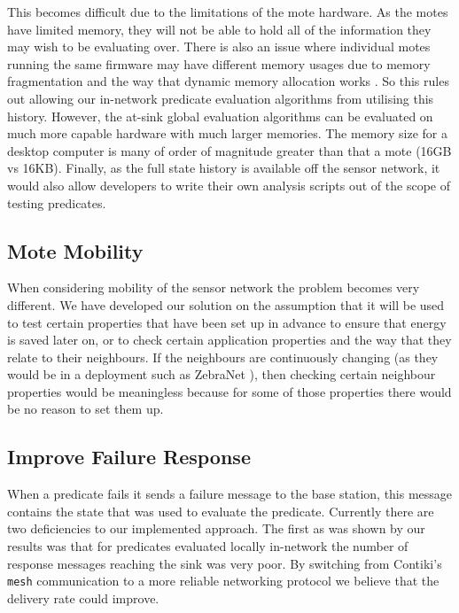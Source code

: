 This becomes difficult due to the limitations of the mote hardware. As the motes have limited memory, they will not be able to hold all of the information they may wish to be evaluating over. There is also an issue where individual motes running the same firmware may have different memory usages due to memory fragmentation and the way that dynamic memory allocation works \cite{Dai:2004:EEL:1031495.1031516}. So this rules out allowing our in-network predicate evaluation algorithms from utilising this history. However, the at-sink global evaluation algorithms can be evaluated on much more capable hardware with much larger memories. The memory size for a desktop computer is many of order of magnitude greater than that a mote (16GB vs 16KB). Finally, as the full state history is available off the sensor network, it would also allow developers to write their own analysis scripts out of the scope of testing predicates.


\subsection{Mote Mobility}

When considering mobility of the sensor network the problem becomes very different. We have developed our solution on the assumption that it will be used to test certain properties that have been set up in advance to ensure that energy is saved later on, or to check certain application properties and the way that they relate to their neighbours. If the neighbours are continuously changing (as they would be in a deployment such as ZebraNet \cite{Juang:2002:ECW:635508.605408}), then checking certain neighbour properties would be meaningless because for some of those properties there would be no reason to set them up.

\subsection{Improve Failure Response}

When a predicate fails it sends a failure message to the base station, this message contains the state that was used to evaluate the predicate. Currently there are two deficiencies to our implemented approach. The first as was shown by our results was that for predicates evaluated locally in-network the number of response messages reaching the sink was very poor. By switching from Contiki's \verb|mesh| communication to a more reliable networking protocol we believe that the delivery rate could improve.

